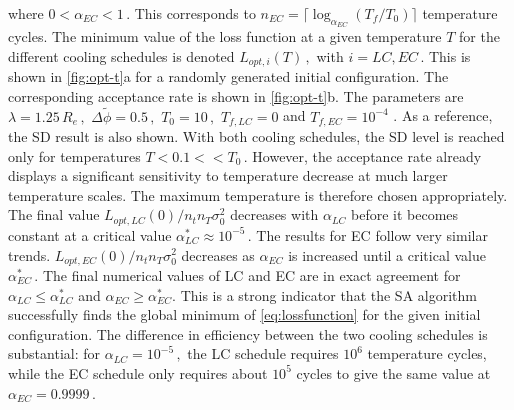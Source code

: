 \documentclass[bachelor,       %
               oneside,        %
               BCOR10mm,       %
               ngerman, english %
               ]{GAUBM}
\begin{document}
where $0<\alpha_{EC}<1\,.$ This corresponds to $n_{EC}=\lceil\log_{\alpha_{EC}}(T_f/T_0)\rceil$ temperature cycles. The minimum value of the loss function at a given temperature $T$ for the different cooling schedules is denoted $L_{opt,i}(T)\,,$ with $i=LC,EC\,.$ This is shown in \autoref{fig:opt-t}a for a randomly generated initial configuration. The corresponding acceptance rate is shown in \autoref{fig:opt-t}b. The parameters are $\lambda=1.25\,R_e\,,$ $\Delta\tilde\phi=0.5\,,$ $T_0=10\,,$ $T_{f,LC}=0$ and $T_{f,EC}=10^{-4}$ . As a reference, the \ac{SD} result is also shown. With both cooling schedules, the \ac{SD} level is reached only for temperatures $T<0.1<<T_0\,.$ However, the acceptance rate already displays a significant sensitivity to temperature decrease at much larger temperature scales. The maximum temperature is therefore chosen appropriately. The final value $L_{opt,LC}(0)/n_tn_T\sigma_0^2$ decreases with $\alpha_{LC}$ before it becomes constant at a critical value $\alpha^*_{LC}\approx 10^{-5}\,.$ The results for \ac{EC} follow very similar trends. $L_{opt,EC}(0)/n_tn_T\sigma_0^2$ decreases as $\alpha_{EC}$ is increased until a critical value $\alpha^*_{EC}\,.$ The final numerical values of \ac{LC} and \ac{EC} are in exact agreement for $\alpha_{LC}\leq \alpha^*_{LC}$ and $\alpha_{EC}\geq \alpha^*_{EC}$. This is a strong indicator that the \ac{SA} algorithm successfully finds the global minimum of \autoref{eq:lossfunction} for the given initial configuration. The difference in efficiency between the two cooling schedules is substantial: for $\alpha_{LC}=10^{-5}\,,$ the \ac{LC} schedule requires $10^6$ temperature cycles, while the \ac{EC} schedule only requires about $10^{5}$ cycles to give the same value at $\alpha_{EC}=0.9999\,.$ 
\end{document}
